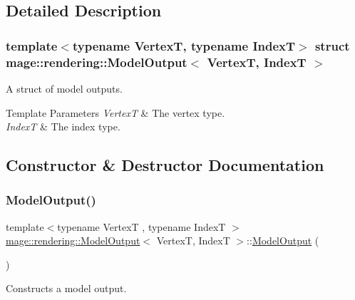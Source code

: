 \subsection{Detailed Description}
\subsubsection*{template$<$typename VertexT, typename IndexT$>$\newline
struct mage\+::rendering\+::\+Model\+Output$<$ Vertex\+T, Index\+T $>$}

A struct of model outputs.


\begin{DoxyTemplParams}{Template Parameters}
{\em VertexT} & The vertex type. \\
\hline
{\em IndexT} & The index type. \\
\hline
\end{DoxyTemplParams}


\subsection{Constructor \& Destructor Documentation}
\hypertarget{structmage_1_1rendering_1_1_model_output_a0aaa7f6abf4c5df03fe02b49ef189e3b}{}\label{structmage_1_1rendering_1_1_model_output_a0aaa7f6abf4c5df03fe02b49ef189e3b} 
\subsubsection{\texorpdfstring{Model\+Output()}{ModelOutput()}\hspace{0.1cm}{\footnotesize\ttfamily [1/3]}}
{\footnotesize\ttfamily template$<$typename VertexT , typename IndexT $>$ \\
\hyperlink{structmage_1_1rendering_1_1_model_output}{mage\+::rendering\+::\+Model\+Output}$<$ VertexT, IndexT $>$\+::\hyperlink{structmage_1_1rendering_1_1_model_output}{Model\+Output} (\begin{DoxyParamCaption}{ }\end{DoxyParamCaption})\hspace{0.3cm}{\ttfamily [default]}}

Constructs a model output. \hypertarget{structmage_1_1rendering_1_1_model_output_a52280b5fe47b266e44bf65ea5dcd6752}{}\label{structmage_1_1rendering_1_1_model_output_a52280b5fe47b266e44bf65ea5dcd6752} 
